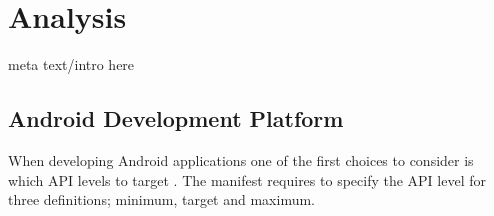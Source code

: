\section{Analysis}
meta text/intro here
\subsection{Android Development Platform}
When developing Android applications one of the first choices to consider is which API levels to target \cite{usesSDK}.
The manifest requires to specify the API level for three definitions; minimum, target and maximum.